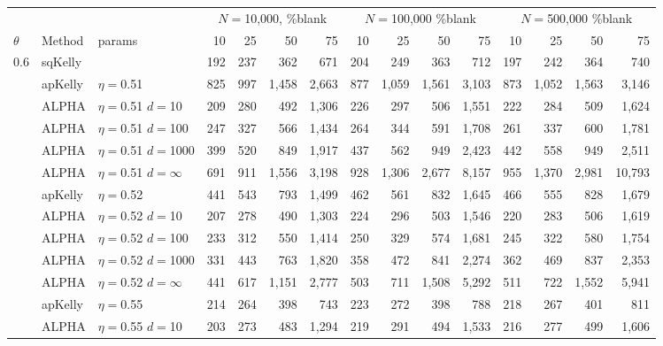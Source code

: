 \documentclass[12pt,runningheads]{llncs}
\begin{document}
{\begin{table}
\tiny
\begin{tabular}{lll|rrrr|rrrr|rrrr} 
& & & \multicolumn{4}{|c|}{$N=$10,000, \%blank} &  \multicolumn{4}{|c|}{$N=$100,000 \%blank} & \multicolumn{4}{|c}{$N=$500,000 \%blank} \\ 
$\theta$ & Method & params & 10 & 25 & 50 & 75  & 10 & 25 & 50 & 75  & 10 & 25 & 50 & 75  \\
\hline 0.6 & sqKelly & & 192  & 237  & 362  & 671  & 204  & 249  & 363  & 712  & 197  & 242  & 364  & 740  \\
\cline{2-15} & apKelly & $\eta=$0.51 & 825  & 997  & 1,458  & 2,663  & 877  & 1,059  & 1,561  & 3,103  & 873  & 1,052  & 1,563  & 3,146  \\
& ALPHA & $\eta=$0.51 $d=$10 & 209  & 280  & 492  & 1,306  & 226  & 297  & 506  & 1,551  & 222  & 284  & 509  & 1,624  \\
& ALPHA & $\eta=$0.51 $d=$100 & 247  & 327  & 566  & 1,434  & 264  & 344  & 591  & 1,708  & 261  & 337  & 600  & 1,781  \\
& ALPHA & $\eta=$0.51 $d=$1000 & 399  & 520  & 849  & 1,917  & 437  & 562  & 949  & 2,423  & 442  & 558  & 949  & 2,511  \\
 & ALPHA & $\eta=$0.51 $d=\infty$ & 691  & 911  & 1,556  & 3,198  & 928  & 1,306  & 2,677  & 8,157  & 955  & 1,370  & 2,981  & 10,793  \\
\cline{2-15} & apKelly & $\eta=$0.52 & 441  & 543  & 793  & 1,499  & 462  & 561  & 832  & 1,645  & 466  & 555  & 828  & 1,679  \\
& ALPHA & $\eta=$0.52 $d=$10 & 207  & 278  & 490  & 1,303  & 224  & 296  & 503  & 1,546  & 220  & 283  & 506  & 1,619  \\
& ALPHA & $\eta=$0.52 $d=$100 & 233  & 312  & 550  & 1,414  & 250  & 329  & 574  & 1,681  & 245  & 322  & 580  & 1,754  \\
& ALPHA & $\eta=$0.52 $d=$1000 & 331  & 443  & 763  & 1,820  & 358  & 472  & 841  & 2,274  & 362  & 469  & 837  & 2,353  \\
 & ALPHA & $\eta=$0.52 $d=\infty$ & 441  & 617  & 1,151  & 2,777  & 503  & 711  & 1,508  & 5,292  & 511  & 722  & 1,552  & 5,941  \\
\cline{2-15} & apKelly & $\eta=$0.55 & 214  & 264  & 398  & 743  & 223  & 272  & 398  & 788  & 218  & 267  & 401  & 811  \\
& ALPHA & $\eta=$0.55 $d=$10 & 203  & 273  & 483  & 1,294  & 219  & 291  & 494  & 1,533  & 216  & 277  & 499  & 1,606  \\

\end{tabular}
\end{table}}
\end{document}

